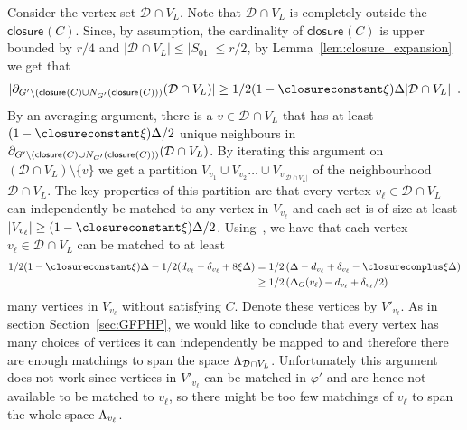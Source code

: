 \documentclass{theoretics}
\providecommand{\abs}[1]{\lvert#1\rvert}
\newcommand{\boundary}[1]{\ensuremath{\partial #1}}
\newcommand{\set}[1]{\{ #1 \}}
\newcommand{\setsize}[1]{\lvert#1\rvert}
\newcommand{\disjointunion}{\overset{.}{\cup}}
\newcommand{\eqperiod}{\enspace .}
\newcommand{\refsec}[1]{Section~\ref{#1}}
\newcommand{\neigh}[2][]{N_{{#1}}(#2)}
\newcommand{\uniqueNeigh}[2][]{\boundary_{{#1}} ({#2})}
\renewcommand{\deg}[2][XXXXXXXXXXXX]{\Delta_{#1}(#2)}
\newcommand{\diff}{\xi}
\newcommand{\GdegMax}{\Delta}
\newcommand{\V}[1][]{V_{#1}}
\newcommand{\Vl}{\V[L]}
\newcommand{\Gprime}{G'}
\newcommand{\thr}[1]{ \ensuremath d_{{#1}} }
\newcommand{\adv}[1]{\delta_{{#1}}}
\newcommand{\linspace}[1][]{\ensuremath \Lambda_{{#1}}}
\newcommand{\closure}[2][]{\mathsf{closure}_{{#1}}(#2)}
\newcommand{\diffclosure}[1][]{D_{{#1}}}
\renewcommand{\diffclosure}[1][]{\mathcal{D}_{{#1}}}
\newcommand{\matchb}{\varphi'}
\numberwithin{equation}{section}
\begin{document}
  Consider the vertex set $\diffclosure \cap \Vl$. Note that 
  $\diffclosure \cap \Vl$ is completely
  outside the $\closure{C}$. Since, by assumption, the cardinality of $\closure{C}$ 
  is upper bounded by $r /
  4$ and $\abs{\diffclosure \cap \Vl} \le \abs{S_{01}} \le r / 2$, by 
  Lemma~\ref{lem:closure_expansion}
  we get that 
  \begin{equation}
  \begin{aligned}
    \abs{ 
    \uniqueNeigh[ {\Gprime \setminus 
    (\closure{C} \cup \neigh[\Gprime]{ {\closure{C}} })} ]
    {\diffclosure \cap \Vl} } 
    \ge 
    1/2(1 - \closureconstant \diff)
    \GdegMax \setsize{\diffclosure \cap \Vl}
    \eqperiod
  \end{aligned}
  \end{equation}
  By an averaging 
  argument, there is a $v \in
  \diffclosure \cap \Vl$ that has at least 
  $(1 - \closureconstant \diff)\GdegMax/2$ unique
  neighbours in 
  $\uniqueNeigh[ {\Gprime \setminus (\closure{C} \cup 
  \neigh[\Gprime]{\closure{C}})} ]
  {\diffclosure \cap \Vl}$.
  By iterating this argument on $(\diffclosure \cap \Vl) \setminus \set{ v }$
  we get a partition 
  $V_{v_1} \disjointunion V_{v_2} \ldots 
  \disjointunion V_{v_{\setsize{\diffclosure \cap \Vl}}}$
  of the neighbourhood $\diffclosure \cap \Vl$. The key properties
  of this partition are that every vertex 
  $v_\ell \in \diffclosure \cap \Vl$ can independently 
  be matched 
  to any vertex in $V_{v_\ell}$ and each set is of size at least
  $\setsize{V_{v_\ell}} \ge (1 - \closureconstant \diff)\GdegMax/2$.
  Using~, we have that each vertex 
  $v_\ell \in \diffclosure\cap\Vl$ can be matched to at least
  \begin{equation}
  \begin{aligned}
  	1/2 (1 - \closureconstant \diff)\GdegMax - 
  	1/2 (\thr{v_\ell} - \adv{v_\ell} + 8 \diff \GdegMax)
  	&= 1/2 \left( \GdegMax - \thr{v_\ell} + \adv{v_\ell} - 
  	\closureconplus \diff \GdegMax \right)\\
  	&\ge 1/2 \left(\deg[G]{v_\ell} - \thr{v_\ell} + \adv{v_\ell}/2 \right)
  \end{aligned}
  \end{equation}
many vertices in $V_{v_\ell}$ without satisfying $C$. Denote these vertices
  by $V'_{v_\ell}$.
  As in section \refsec{sec:GFPHP}, we would like to conclude that
  every vertex has many choices of vertices it can independently be mapped to and
  therefore there are enough matchings to span the
  space $\linspace[\diffclosure \cap \Vl]$.
  Unfortunately this argument does
  not work since vertices in $V'_{v_\ell}$ can be matched in
  $\matchb$ and are hence not available to be matched to
  $v_\ell$, so there might be too few matchings of $v_\ell$ to span the whole space $\linspace[v_\ell]$.
\end{document}
